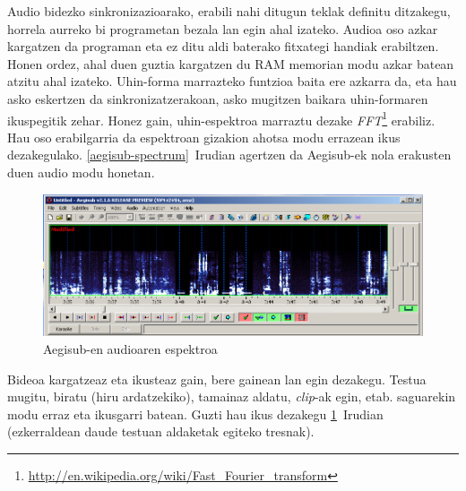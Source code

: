 Audio bidezko sinkronizazioarako, erabili nahi ditugun teklak definitu ditzakegu, horrela aurreko bi programetan bezala lan egin ahal izateko. Audioa oso azkar kargatzen da programan eta ez ditu aldi baterako fitxategi handiak erabiltzen. Honen ordez, ahal duen guztia kargatzen du RAM memorian modu azkar batean atzitu ahal izateko. Uhin-forma marrazteko funtzioa baita ere azkarra da, eta hau asko eskertzen da sinkronizatzerakoan, asko mugitzen baikara uhin-formaren ikuspegitik zehar. Honez gain, uhin-espektroa marraztu dezake \textit{FFT}\footnote{\url{http://en.wikipedia.org/wiki/Fast_Fourier_transform}} erabiliz. Hau oso erabilgarria da espektroan gizakion ahotsa modu errazean ikus dezakegulako. \ref{aegisub-spectrum}~Irudian agertzen da Aegisub-ek nola erakusten duen audio modu honetan.
\begin{figure}[htbp]
\begin{center}
\includegraphics[width=\columnwidth, natwidth=728pt, natheight=532pt]{Pictures/Chapter2/aegisub-spectrum.png}
\caption{Aegisub-en audioaren espektroa}
\label{aegisub-bideo}
\end{center}
\end{figure}

Bideoa kargatzeaz eta ikusteaz gain, bere gainean lan egin dezakegu. Testua mugitu, biratu (hiru ardatzekiko), tamainaz aldatu, \textit{clip}-ak egin, etab. saguarekin modu erraz eta ikusgarri batean. Guzti hau ikus dezakegu \ref{aegisub-bideo}~Irudian (ezkerraldean daude testuan aldaketak egiteko tresnak).

